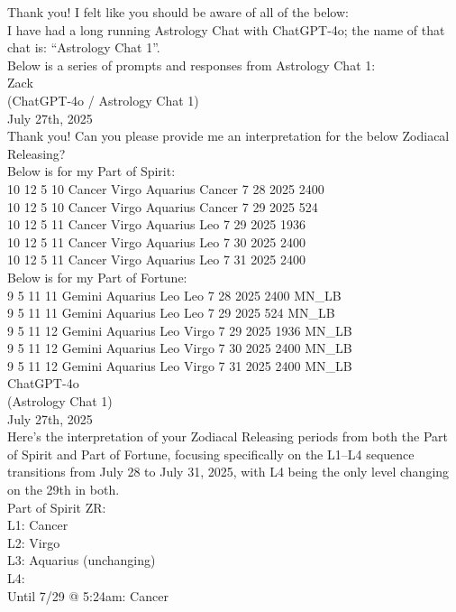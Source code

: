 \documentclass{article}
\begin{document}
Thank you! I felt like you should be aware of all of the below:\\
I have had a long running Astrology Chat with ChatGPT-4o; the name of that chat is: ``Astrology Chat 1''.\\
Below is a series of prompts and responses from Astrology Chat 1:\\
Zack\\
(ChatGPT-4o / Astrology Chat 1)\\
July 27th, 2025\\
Thank you! Can you please provide me an interpretation for the below Zodiacal Releasing?\\
Below is for my Part of Spirit:\\
10 12 5 10 Cancer Virgo Aquarius Cancer 7 28 2025 2400\\
10 12 5 10 Cancer Virgo Aquarius Cancer 7 29 2025 524\\
10 12 5 11 Cancer Virgo Aquarius Leo 7 29 2025 1936\\
10 12 5 11 Cancer Virgo Aquarius Leo 7 30 2025 2400\\
10 12 5 11 Cancer Virgo Aquarius Leo 7 31 2025 2400\\
Below is for my Part of Fortune:\\
9 5 11 11 Gemini Aquarius Leo Leo 7 28 2025 2400 MN\_LB\\
9 5 11 11 Gemini Aquarius Leo Leo 7 29 2025 524 MN\_LB\\
9 5 11 12 Gemini Aquarius Leo Virgo 7 29 2025 1936 MN\_LB\\
9 5 11 12 Gemini Aquarius Leo Virgo 7 30 2025 2400 MN\_LB\\
9 5 11 12 Gemini Aquarius Leo Virgo 7 31 2025 2400 MN\_LB\\
ChatGPT-4o\\
(Astrology Chat 1)\\
July 27th, 2025\\
Here's the interpretation of your Zodiacal Releasing periods from both the Part of Spirit and Part of Fortune, focusing specifically on the L1--L4 sequence transitions from July 28 to July 31, 2025, with L4 being the only level changing on the 29th in both.\\
Part of Spirit ZR:\\
L1: Cancer\\
L2: Virgo\\
L3: Aquarius (unchanging)\\
L4:\\
Until 7/29 @ 5:24am: Cancer\\
\end{document}
